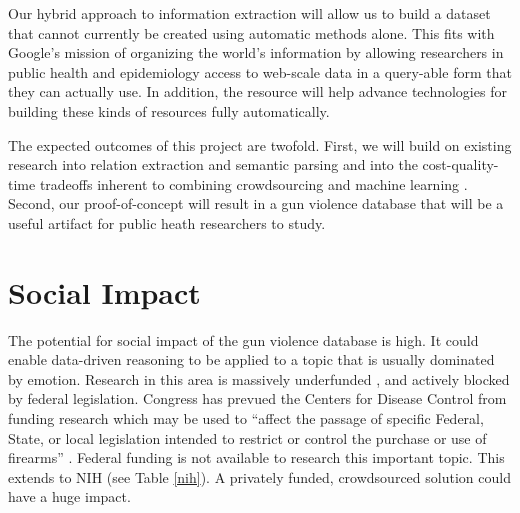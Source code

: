\documentclass[11pt]{article}
\begin{document}

Our hybrid approach to information extraction will allow us to build a dataset that cannot currently be created using automatic methods alone. This fits with Google's mission of organizing the world's information by allowing researchers in public health and epidemiology access to web-scale data in a query-able form that they can actually use. In addition, the resource will help advance technologies for building these kinds of resources fully automatically. 

The expected outcomes of this project are twofold.  First, we will build on existing research into relation extraction and semantic parsing \cite{mintz2009distant,cai2013semantic,yao2014information} and into the cost-quality-time tradeoffs inherent to combining crowdsourcing and machine learning \cite{Quinn11human-machinehybrid,Lin-et-al:HCOMP:2014}.  Second, our proof-of-concept will result in a gun violence database that will be a useful artifact for public heath researchers to study.

\section{Social Impact}

The potential for social impact of the gun violence database is high. It could enable data-driven reasoning to be applied to a topic that is usually dominated by emotion.   Research in this area is massively underfunded \cite{roth1993understanding}, and actively blocked by federal legislation.  Congress has prevued the Centers for Disease Control  from funding research which may be used to ``affect the passage of specific Federal, State, or local legislation intended to restrict or control the purchase or use of firearms'' \cite{kassirer1995partisan}.   Federal funding is not available to research this important topic.  This extends to NIH (see Table \ref{nih}).  A privately funded, crowdsourced solution could have a huge impact.
\end{document}
